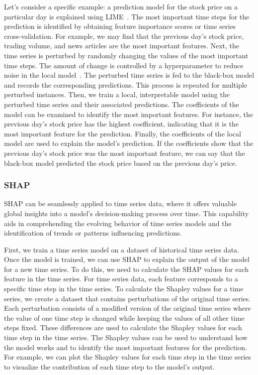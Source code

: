 \documentclass[final,5p,times,twocolumn]{elsarticle}
\begin{document}
Let's consider a specific example: a prediction model for the stock price on a particular day is explained using LIME~\cite{lakkaraju2016interpretable}. The most important time steps for the prediction is identified by obtaining feature importance scores or time series cross-validation. For example, we may find that the previous day's stock price, trading volume, and news articles are the most important features. 
Next, the time series is perturbed by randomly changing the values of the most important time steps. The amount of change is controlled by a hyperparameter %
to reduce noise in the local model~\cite{ribeiro2016model}. The perturbed time series is fed to the black-box model and records the corresponding predictions. This process is repeated for multiple perturbed instances. Then, we train a local, interpretable model using the perturbed time series and their associated predictions. The coefficients of the model can be examined to identify the most important features. For instance, the previous day's stock price has the highest coefficient, indicating that it is the most important feature for the prediction. Finally, the coefficients of the local model are used to explain the model's prediction. If the coefficients show that the previous day's stock price was the most important feature, we can say that the black-box model predicted the stock price based on the previous day's price.


\subsubsection{SHAP}
SHAP can be seamlessly applied to time series data, where it offers valuable global insights into a model's decision-making process over time. This capability aids in comprehending the evolving behavior of time series models and the identification of trends or patterns influencing predictions. 

First, we train a time series model on a dataset of historical time series data. Once the model is trained, we can use SHAP to explain the output of the model for a new time series. To do this, we need to calculate the SHAP values for each feature in the time series. 
For time series data, each feature corresponds to a specific time step in the time series.
To calculate the Shapley values for a time series, we create a dataset that contains perturbations of the original time series. Each perturbation consists of a modified version of the original time series where the value of one time step is changed while keeping the values of all other time steps fixed. 
These differences are used to calculate the Shapley values for each time step in the time series. The Shapley values can be used to understand how the model works and to identify the most important features for the prediction. For example, we can plot the Shapley values for each time step in the time series to visualize the contribution of each time step to the model's output.
\end{document}
